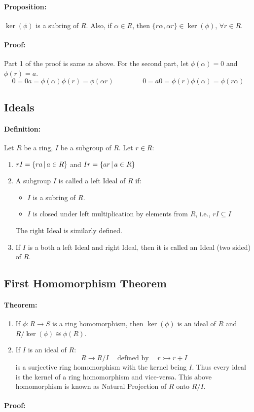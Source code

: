 \documentclass[12pt, oneside]{book}
\begin{document}
\paragraph{Proposition:} \(\ker(\phi)\) is a subring of \(R\).
Also, if \(\alpha \in R\), then \(\{r \alpha, \alpha r\} \in \ker(\phi)\), \(\forall r \in R\).
\paragraph{Proof:} Part 1 of the proof is same as above.
For the second part, let \(\phi(\alpha) = 0\) and \(\phi(r) = a\).
\[0 = 0 a = \phi(\alpha)\phi(r) = \phi(\alpha r) \hspace{50pt} 0 = a0 = \phi(r) \phi(\alpha) = \phi(r \alpha)\]

\subsection{Ideals}
\paragraph{Definition:} Let \(R\) be a ring, \(I\) be a subgroup of \(R\). Let \(r \in R\):
\begin{enumerate}
    \item \(rI = \{ra \; \vline \; a \in R\}\) and \(Ir = \{ar \; \vline \; a \in R\}\) 
    \item A subgroup \(I\) is called a left Ideal of \(R\) if:
    \begin{itemize}
        \item \(I\) is a subring of \(R\).
        \item \(I\) is closed under left multiplication by elements from \(R\), i.e., \(rI \subseteq I\)
    \end{itemize}
    The right Ideal is similarly defined.
    \item If \(I\) is a both a left Ideal and right Ideal, then it is called an Ideal (two sided) of \(R\).
\end{enumerate}

\subsection{First Homomorphism Theorem}
\paragraph{Theorem:}
\begin{enumerate}
    \item If \(\phi: R \rightarrow S\) is a ring homomorphism, then \(\ker(\phi)\) is an ideal of \(R\) and \(R/\ker(\phi) \cong \phi(R)\).
    \item If \(I\) is an ideal of \(R\):
    \[R \rightarrow R/I \hspace{15pt} \text{defined by} \hspace{15pt} r \rightarrowtail r + I\]
    is a surjective ring homomorphism with the kernel being \(I\).
    Thus every ideal is the kernel of a ring homomorphism and vice-versa.
    This above homomorphism is known as Natural Projection of \(R\) onto \(R/I\).
\end{enumerate}
\paragraph{Proof:}
\end{document}
